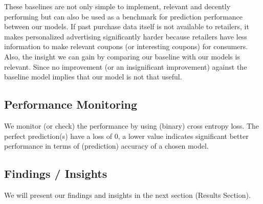 These baselines are not only simple to implement, relevant and decently
performing but can also be used as a benchmark for prediction performance between
our models. If past purchase data itself is not available to retailers, it makes
personalized advertising significantly harder because retailers have less
information to make relevant coupons (or interesting coupons) for consumers.
Also, the insight we can gain by comparing our baseline with our models is
relevant. Since no improvement (or an insignificant improvement) against the
baseline model implies that our model is not that useful.

\subsection{Performance Monitoring}
We monitor (or check) the performance by using (binary) cross entropy loss. The
perfect prediction(s) have a loss of 0, a lower value indicates significant
better performance in terms of (prediction) accuracy of a chosen model.

\subsection{Findings / Insights}
We will present our findings and insights in the next section (Results Section).
